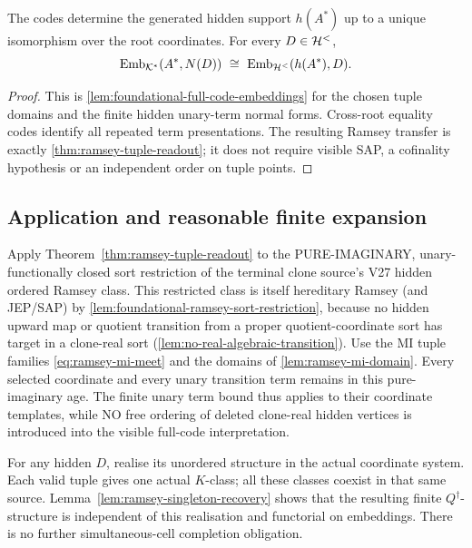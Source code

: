 \begin{lemma}\label{lem:ramsey-template-bijection}
The codes determine the generated hidden support $h(A^*)$ up to a unique
isomorphism over the root coordinates. For every $D\in\mathcal{H}^{<}$,
\begin{equation}\label{eq:ramsey-embeddings}
       \operatorname{Emb}_{\mathcal{K}^{*}}(A^*,N(D))\ \cong\ \operatorname{Emb}_{\mathcal{H}^{<}}(h(A^*),D).
\end{equation}
\end{lemma}
\begin{proof}
This is \cref{lem:foundational-full-code-embeddings} for the chosen tuple
domains and the finite hidden unary-term normal forms. Cross-root equality
codes identify all repeated term presentations. The resulting Ramsey
transfer is exactly \cref{thm:ramsey-tuple-readout}; it does not require
visible SAP, a cofinality hypothesis or an independent order on tuple points.
\end{proof}

\subsection{Application and reasonable finite expansion}

Apply Theorem~\ref{thm:ramsey-tuple-readout}
to the PURE-IMAGINARY, unary-functionally
closed sort restriction of the terminal
clone source's V27 hidden ordered Ramsey
class. This restricted class is itself
hereditary Ramsey (and JEP/SAP) by
\cref{lem:foundational-ramsey-sort-restriction},
because no hidden upward map or quotient
transition from a proper quotient-coordinate
sort has target in a clone-real sort
(\cref{lem:no-real-algebraic-transition}).
Use the MI tuple families
\eqref{eq:ramsey-mi-meet} and the domains
of \cref{lem:ramsey-mi-domain}.
Every selected coordinate and every unary
transition term remains in this
pure-imaginary age. The finite unary term
bound thus applies to their coordinate
templates, while NO free ordering of deleted
clone-real hidden vertices is introduced
into the visible full-code interpretation.

For any hidden $D$, realise its unordered structure in the actual coordinate
system. Each valid tuple gives one actual $K$-class; all these classes coexist
in that same source. Lemma~\ref{lem:ramsey-singleton-recovery} shows that the resulting finite
$Q^\dagger$-structure is independent of this realisation and functorial on
embeddings. There is no further simultaneous-cell completion obligation.

